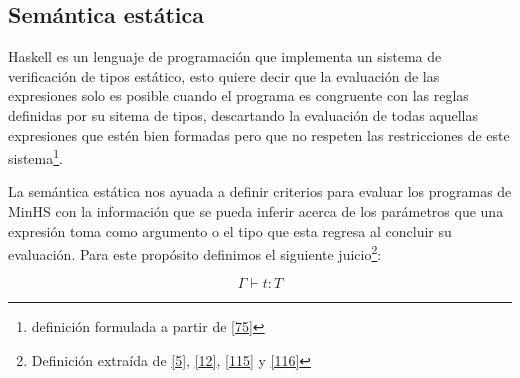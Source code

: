 \subsection{Semántica estática}

    \textsf{Haskell} es un lenguaje de programación que implementa un sistema de verificación de tipos estático, esto quiere decir que la evaluación de las expresiones solo es posible cuando el programa es congruente con las reglas definidas por su sitema de tipos, descartando la evaluación de todas aquellas expresiones que estén bien formadas pero que no respeten las restricciones de este sistema\footnote{definición formulada a partir de \hyperlink{75}{[75]}}. 


    \begin{definition}
       La semántica estática nos ayuada a definir criterios para evaluar los programas de \textsf{MinHS} con la información que se pueda inferir acerca de los parámetros que una expresión toma como argumento o el tipo que esta regresa al concluir su evaluación. Para este propósito definimos el siguiente juicio\footnote{Definición extraída de  \hyperlink{5}{[5]},  \hyperlink{12}{[12]}, \hyperlink{115}{[115]} y \hyperlink{116}{[116]}}:
    
    $$\Gamma\vdash t: T$$
    

\end{definition}
